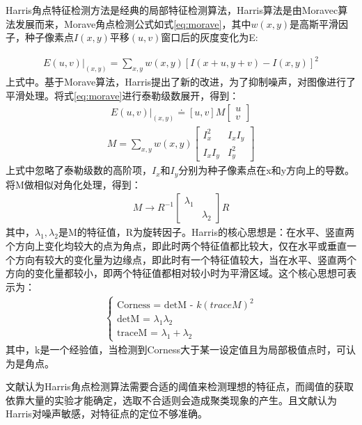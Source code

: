 Harris角点特征检测方法\cite{harris}是经典的局部特征检测算法，Harris算法是由Moravec\cite{moravec}算法发展而来，Morave角点检测公式如式\ref{eq:morave}，其中$w(x, y)$是高斯平滑因子，种子像素点$I(x, y)$平移$(u, v)$窗口后的灰度变化为E:

\begin{align}
E(u, v)|_{(x, y)} = \sum_{x, y}w(x, y)[I(x + u, y + v) - I(x, y)]^2 
\label{eq:morave}
\end{align}
上式中。基于Morave算法，Harris提出了新的改进，为了抑制噪声，对图像进行了平滑处理。将式\ref{eq:morave}进行泰勒级数展开，得到：
\begin{align}
E(u, v)|_{(x, y)} \doteq [u, v]M\left[ \begin{array}{l}
u \\
v
\end{array} \right]
\end{align}
\begin{align}
M = \sum_{x, y} w(x, y)\left[ \begin{array}{ll}
I_x^2 & I_xI_y\\
I_xI_y & I_y^2
\end{array} \right]
\end{align}
上式中忽略了泰勒级数的高阶项，$I_x$和$I_y$分别为种子像素点在x和y方向上的导数。将M做相似对角化处理，得到：
\begin{align}
M \to R^{-1}\left[ \begin{array}{ll}
\lambda_1 & \\
 & \lambda_2
\end{array} \right]R
\end{align}
其中，$\lambda_1, \lambda_2$是M的特征值，R为旋转因子。Harris的核心思想是：在水平、竖直两个方向上变化均较大的点为角点，即此时两个特征值都比较大，仅在水平或垂直一个方向有较大的变化量为边缘点，即此时有一个特征值较大，当在水平、竖直两个方向的变化量都较小，即两个特征值都相对较小时为平滑区域。这个核心思想可表示为：
\begin{align}
\left\{ \begin{array}{l}
\textrm{Corness = detM - $k(traceM)^2$} \\
\textrm{detM = $\lambda_1\lambda_2$} \\
\textrm{traceM = $\lambda_1 + \lambda_2$}
\end{array} \right.
\end{align}
其中，k是一个经验值，当检测到Corness大于某一设定值且为局部极值点时，可认为是角点。

文献\cite{yezhiyong}认为Harris角点检测算法需要合适的阈值来检测理想的特征点，而阈值的获取依靠大量的实验才能确定，选取不合适则会造成聚类现象的产生。且文献\cite{zhangyong}认为Harris对噪声敏感，对特征点的定位不够准确。

